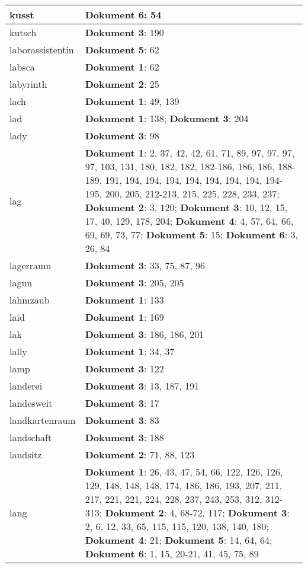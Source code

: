 \documentclass[a5paper]{article}
\begin{document}
\begin{longtable}[l]{|l|p{3in}|}
\hline
kusst & \textbf{Dokument 6}: 54 \\
\hline
kutsch & \textbf{Dokument 3}: 190 \\
\hline
laborassistentin & \textbf{Dokument 5}: 62 \\
\hline
labsca & \textbf{Dokument 1}: 62 \\
\hline
labyrinth & \textbf{Dokument 2}: 25 \\
\hline
lach & \textbf{Dokument 1}: 49, 139 \\
\hline
lad & \textbf{Dokument 1}: 138; \textbf{Dokument 3}: 204 \\
\hline
lady & \textbf{Dokument 3}: 98 \\
\hline
lag & \textbf{Dokument 1}: 2, 37, 42, 42, 61, 71, 89, 97, 97, 97, 97, 103, 131, 180, 182, 182, 182-186, 186, 186, 188-189, 191, 194, 194, 194, 194, 194, 194, 194, 194-195, 200, 205, 212-213, 215, 225, 228, 233, 237; \textbf{Dokument 2}: 3, 120; \textbf{Dokument 3}: 10, 12, 15, 17, 40, 129, 178, 204; \textbf{Dokument 4}: 4, 57, 64, 66, 69, 69, 73, 77; \textbf{Dokument 5}: 15; \textbf{Dokument 6}: 3, 26, 84 \\
\hline
lagerraum & \textbf{Dokument 3}: 33, 75, 87, 96 \\
\hline
lagun & \textbf{Dokument 3}: 205, 205 \\
\hline
lahmzaub & \textbf{Dokument 1}: 133 \\
\hline
laid & \textbf{Dokument 1}: 169 \\
\hline
lak & \textbf{Dokument 3}: 186, 186, 201 \\
\hline
lally & \textbf{Dokument 1}: 34, 37 \\
\hline
lamp & \textbf{Dokument 3}: 122 \\
\hline
landerei & \textbf{Dokument 3}: 13, 187, 191 \\
\hline
landesweit & \textbf{Dokument 3}: 17 \\
\hline
landkartenraum & \textbf{Dokument 3}: 83 \\
\hline
landschaft & \textbf{Dokument 3}: 188 \\
\hline
landsitz & \textbf{Dokument 2}: 71, 88, 123 \\
\hline
lang & \textbf{Dokument 1}: 26, 43, 47, 54, 66, 122, 126, 126, 129, 148, 148, 148, 174, 186, 186, 193, 207, 211, 217, 221, 221, 224, 228, 237, 243, 253, 312, 312-313; \textbf{Dokument 2}: 4, 68-72, 117; \textbf{Dokument 3}: 2, 6, 12, 33, 65, 115, 115, 120, 138, 140, 180; \textbf{Dokument 4}: 21; \textbf{Dokument 5}: 14, 64, 64; \textbf{Dokument 6}: 1, 15, 20-21, 41, 45, 75, 89 \\

\end{longtable}
\end{document}
